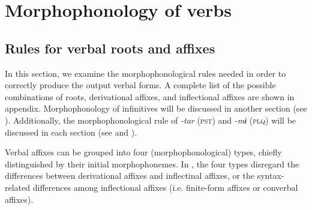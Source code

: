 \section{Morphophonology of verbs}
\label{bkm:Ref356245430}\subsection{Rules for verbal roots and affixes}

In this section, we examine the morphophonological rules needed in order to correctly produce the output verbal forms. A complete list of the possible combinations of roots, derivational affixes, and inflectional affixes are shown in appendix. Morphophonology of infinitives will be discussed in another section (see ). Additionally, the morphophonological rule of \textit{-tar} (\textsc{pst}) and \textit{-mɨ} (\textsc{plq}) will be discussed in each section (see  and ).

  Verbal affixes can be grouped into four (morphophonological) types, chiefly distinguished by their initial morphophonemes. In , the four types disregard the differences between derivational affixes and inflectinal affixes, or the syntax-related differences among inflectional affixes (i.e. finite-form affixes or converbal affixes).

